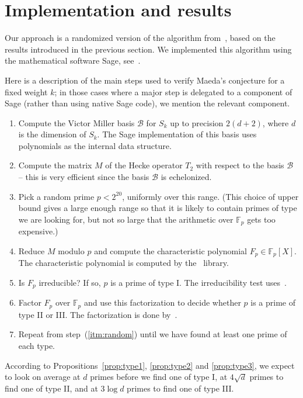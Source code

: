 \documentclass{book}
\newcommand{\FF}{\mathbb{F}}
\newcommand{\cB}{\mathcal{B}}
\begin{document}
\section{Implementation and results}
\label{sect:implementation}
Our approach is a randomized version of the algorithm
from~\cite{ConreyFarmer}, based on the results introduced in the previous
section.  We implemented this algorithm using the mathematical software Sage, 
see~\cite{Sage}.

Here is a description of the main steps used to verify Maeda's conjecture for
a fixed weight $k$; in those cases where a major step is delegated to a
component of Sage (rather than using native Sage code), we mention the
relevant component.
\begin{enumerate}
  \item\label{itm:vmbasis} Compute the Victor Miller basis $\cB$ for $S_k$ up 
    to precision
    $2(d+2)$, where $d$ is the dimension of $S_k$.  The Sage implementation of
    this basis uses~\cite{FLINT} polynomials as the internal data structure.
  \item\label{itm:hecke} Compute the matrix $M$ of the Hecke operator $T_2$ 
    with respect to the
    basis $\cB$ -- this is very efficient since the basis $\cB$ is
    echelonized.
  \item\label{itm:random} Pick a random prime $p<2^{20}$, uniformly over this
    range.  (This choice of upper
    bound gives a large enough range so that it is likely to contain primes of
    type we are looking for, but not so large that the arithmetic over $\FF_p$
    gets too expensive.)
  \item Reduce $M$ modulo $p$ and compute the characteristic polynomial
    $F_p\in \FF_p[X]$.  The characteristic polynomial is computed by
    the~\cite{Linbox} library.
  \item Is $F_p$ irreducible?  If so, $p$ is a prime of type I.  The
    irreducibility test uses~\cite{FLINT}.
  \item Factor $F_p$ over $\FF_p$ and use this factorization to decide whether
    $p$ is a prime of type II or III.  The factorization is done
    by~\cite{FLINT}.
  \item Repeat from step~(\ref{itm:random}) until we have found at
    least one prime of each type.
\end{enumerate}

According to Propositions~\ref{prop:type1}, \ref{prop:type2} and
\ref{prop:type3}, we expect to look on average at $d$ primes before we find
one of type I, at $4\sqrt{d}$ primes to find one of type II, and at $3\log d$
primes to find one of type III.
\end{document}
